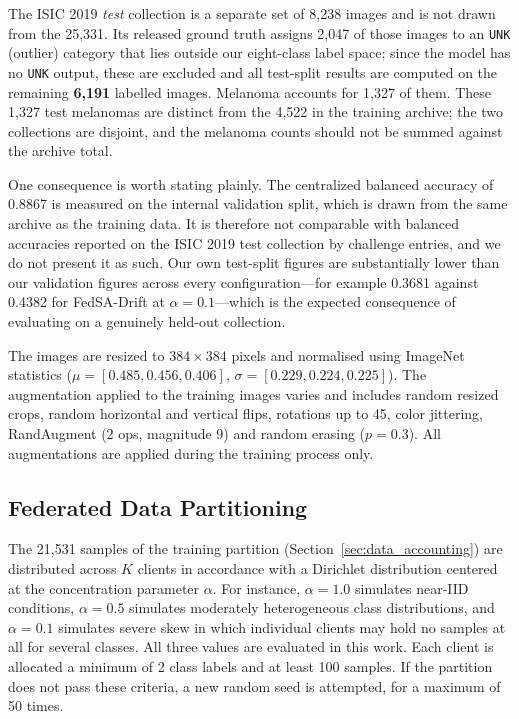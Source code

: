 \documentclass[utf8]{FrontiersinHarvard} %
\newcommand{\sadrift}{FedSA-Drift}
\begin{document}
The ISIC 2019 \emph{test} collection is a separate set of 8,238 images and is not drawn from the 25,331. Its released ground truth assigns 2,047 of those images to an \texttt{UNK} (outlier) category that lies outside our eight-class label space; since the model has no \texttt{UNK} output, these are excluded and all test-split results are computed on the remaining \textbf{6,191} labelled images. Melanoma accounts for 1,327 of them. These 1,327 test melanomas are distinct from the 4,522 in the training archive; the two collections are disjoint, and the melanoma counts should not be summed against the archive total.

One consequence is worth stating plainly. The centralized balanced accuracy of 0.8867 is measured on the internal validation split, which is drawn from the same archive as the training data. It is therefore not comparable with balanced accuracies reported on the ISIC 2019 test collection by challenge entries, and we do not present it as such. Our own test-split figures are substantially lower than our validation figures across every configuration---for example 0.3681 against 0.4382 for \sadrift{} at $\alpha{=}0.1$---which is the expected consequence of evaluating on a genuinely held-out collection.

The images are resized to $384 \times 384$ pixels and normalised using ImageNet statistics ($\mu = [0.485, 0.456, 0.406]$, $\sigma = [0.229, 0.224, 0.225]$). The augmentation applied to the training images varies and includes random resized crops, random horizontal and vertical flips, rotations up to 45\textdegree, color jittering, RandAugment (2 ops, magnitude 9) and random erasing ($p=0.3$). All augmentations are applied during the training process only.

\subsection{Federated Data Partitioning}

The 21,531 samples of the training partition (Section~\ref{sec:data_accounting}) are distributed across $K$ clients in accordance with a Dirichlet distribution centered at the concentration parameter $\alpha$. For instance, $\alpha = 1.0$ simulates near-IID conditions, $\alpha = 0.5$ simulates moderately heterogeneous class distributions, and $\alpha = 0.1$ simulates severe skew in which individual clients may hold no samples at all for several classes. All three values are evaluated in this work. Each client is allocated a minimum of 2 class labels and at least 100 samples. If the partition does not pass these criteria, a new random seed is attempted, for a maximum of 50 times.
\end{document}
